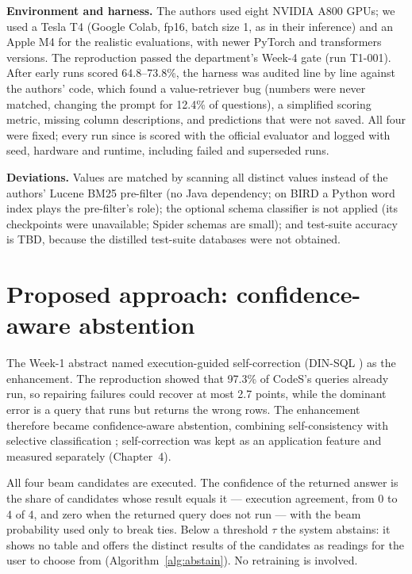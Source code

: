 \textbf{Environment and harness.} The authors used eight NVIDIA A800 GPUs; we used a Tesla T4 (Google Colab, fp16, batch size 1, as in their inference) and an Apple M4 for the realistic evaluations, with newer PyTorch and transformers versions. The reproduction passed the department's Week-4 gate (run T1-001). After early runs scored 64.8--73.8\%, the harness was audited line by line against the authors' code, which found a value-retriever bug (numbers were never matched, changing the prompt for 12.4\% of questions), a simplified scoring metric, missing column descriptions, and predictions that were not saved. All four were fixed; every run since is scored with the official evaluator \cite{zhong2020semantic} and logged with seed, hardware and runtime, including failed and superseded runs.

\textbf{Deviations.} Values are matched by scanning all distinct values instead of the authors' Lucene BM25 pre-filter (no Java dependency; on BIRD a Python word index plays the pre-filter's role); the optional schema classifier is not applied (its checkpoints were unavailable; Spider schemas are small); and test-suite accuracy is TBD, because the distilled test-suite databases were not obtained.

\section{Proposed approach: confidence-aware abstention}

The Week-1 abstract named execution-guided self-correction (DIN-SQL \cite{pourreza2023dinsql}) as the enhancement. The reproduction showed that 97.3\% of CodeS's queries already run, so repairing failures could recover at most 2.7 points, while the dominant error is a query that runs but returns the wrong rows. The enhancement therefore became confidence-aware abstention, combining self-consistency \cite{wang2022selfconsistency} with selective classification \cite{geifman2017selective}; self-correction was kept as an application feature and measured separately (Chapter~4).

All four beam candidates are executed. The confidence of the returned answer is the share of candidates whose result equals it --- execution agreement, from 0 to 4 of 4, and zero when the returned query does not run --- with the beam probability used only to break ties. Below a threshold $\tau$ the system abstains: it shows no table and offers the distinct results of the candidates as readings for the user to choose from (Algorithm~\ref{alg:abstain}). No retraining is involved.

